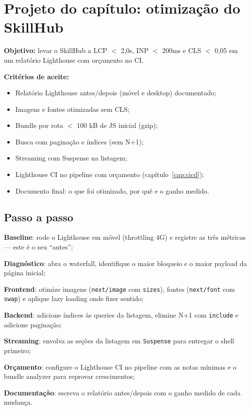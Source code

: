 \section{Projeto do capítulo: otimização do SkillHub}
\label{sec:projeto20}

\begin{caixaprojeto}
\textbf{Objetivo:} levar o SkillHub a LCP $<$ 2,0s, INP $<$ 200ms e CLS $<$ 0,05
em um relatório Lighthouse com orçamento no CI.

\textbf{Critérios de aceite:}
\begin{itemize}[leftmargin=*, itemsep=0.2em]
  \item Relatório Lighthouse antes/depois (móvel e desktop) documentado;
  \item Imagens e fontes otimizadas sem CLS;
  \item Bundle por rota $<$ 100 kB de JS inicial (gzip);
  \item Busca com paginação e índices (sem N+1);
  \item Streaming com Suspense na listagem;
  \item Lighthouse CI no pipeline com orçamento (capítulo~\ref{cap:cicd});
  \item Documento final: o que foi otimizado, por quê e o ganho medido.
\end{itemize}
\end{caixaprojeto}

\subsection{Passo a passo}

\begin{passos}
  \item \textbf{Baseline}: rode o Lighthouse em móvel (throttling 4G) e
  registre as três métricas — este é o seu ``antes'';
  \item \textbf{Diagnóstico}: abra o waterfall, identifique o maior bloqueio e
  o maior payload da página inicial;
  \item \textbf{Frontend}: otimize imagens (\texttt{next/image} com
  \texttt{sizes}), fontes (\texttt{next/font} com \texttt{swap}) e aplique
  lazy loading onde fizer sentido;
  \item \textbf{Backend}: adicione índices às queries da listagem, elimine
  N+1 com \texttt{include} e adicione paginação;
  \item \textbf{Streaming}: envolva as seções da listagem em \texttt{Suspense}
  para entregar o shell primeiro;
  \item \textbf{Orçamento}: configure o Lighthouse CI no pipeline com as
  notas mínimas e o bundle analyzer para reprovar crescimentos;
  \item \textbf{Documentação}: escreva o relatório antes/depois com o ganho
  medido de cada mudança.
\end{passos}

